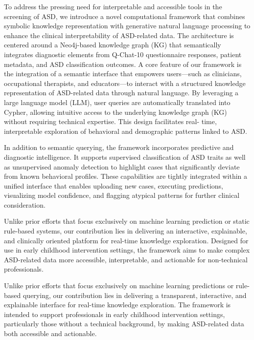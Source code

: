 \documentclass[pdflatex,sn-basic]{sn-jnl}%
\theoremstyle{thmstyleone}%
\theoremstyle{thmstyletwo}%
\theoremstyle{thmstylethree}%
\begin{document}
  To address the pressing need for interpretable and accessible tools in the screening of ASD, we introduce a novel computational
  framework that combines symbolic knowledge representation with generative natural language processing to enhance the clinical
  interpretability of ASD-related data. The architecture is centered around a Neo4j-based knowledge graph (KG) that semantically
  integrates diagnostic elements from Q-Chat-10 questionnaire responses, patient metadata, and ASD classification outcomes.
  A core feature of our framework is the integration of a semantic interface that empowers users---such as clinicians,
  occupational therapists, and educators---to interact with a structured knowledge representation of ASD-related data through
  natural language. By leveraging a large language model (LLM), user queries are automatically translated into Cypher, allowing
  intuitive access to the underlying knowledge graph (KG) without requiring technical expertise. This design facilitates real-
  time, interpretable exploration of behavioral and demographic patterns linked to ASD.

  In addition to semantic querying, the framework incorporates predictive and diagnostic intelligence. It supports supervised
  classification of ASD traits as well as unsupervised anomaly detection to highlight cases that significantly deviate from known
  behavioral profiles. These capabilities are tightly integrated within a unified interface that enables uploading new cases,
  executing predictions, visualizing model confidence, and flagging atypical patterns for further clinical consideration.

  Unlike prior efforts that focus exclusively on machine learning prediction or static rule-based systems, our contribution lies
  in delivering an interactive, explainable, and clinically oriented platform for real-time knowledge exploration. Designed for
  use in early childhood intervention settings, the framework aims to make complex ASD-related data more accessible,
  interpretable, and actionable for non-technical professionals.

  Unlike prior efforts that focus exclusively on machine learning predictions or rule-based querying, our contribution lies in
  delivering a transparent, interactive, and explainable interface for real-time knowledge exploration. The framework is intended
  to support professionals in early childhood intervention settings, particularly those without a technical background, by making
  ASD-related data both accessible and actionable.
\end{document}
